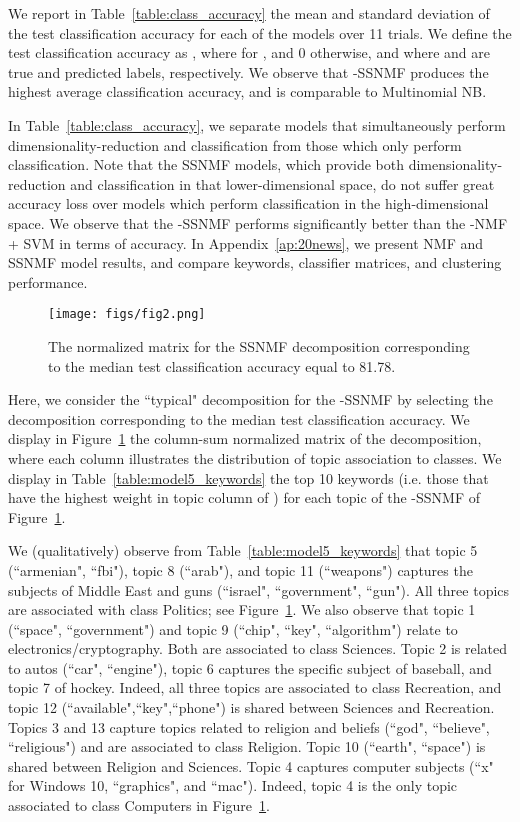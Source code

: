 \documentclass[twocolumn,10pt]{article}
\begin{document}
We report in Table~\ref{table:class_accuracy} the mean and standard deviation of the test classification accuracy for each of the models over 11 trials.
We define the test classification accuracy as , where  for , and 0 otherwise, and where  and  are true and predicted labels, respectively.
We observe that -SSNMF produces the highest average classification accuracy, and is comparable to 
Multinomial NB.

In Table~\ref{table:class_accuracy}, we separate models that simultaneously perform dimensionality-reduction and classification from those which only perform classification.  Note that the SSNMF models, which provide both dimensionality-reduction and classification in that lower-dimensional space, do not suffer great accuracy loss over models which perform classification in the high-dimensional space.
We observe that the -SSNMF performs significantly better than the -NMF + SVM in terms of accuracy.
In Appendix~\ref{ap:20news}, we present NMF and SSNMF model results, and compare keywords, classifier matrices, and clustering performance.
\begin{figure}[tb]
    \centering
    \texttt{[image: figs/fig2.png]}
    \caption{The normalized  matrix for the  SSNMF decomposition corresponding to the median test classification accuracy equal to 81.78.}
    \label{fig:SSNMF_Model5}
\end{figure}

Here, we consider the ``typical" decomposition for the -SSNMF by selecting the decomposition corresponding to the median test classification accuracy.
We display in Figure~\ref{fig:SSNMF_Model5} the column-sum normalized  matrix of the decomposition, where each column illustrates the distribution of topic association to classes.
We display in Table~\ref{table:model5_keywords} the top 10 keywords (i.e. those that have the highest weight in topic column of ) for each topic of the -SSNMF of Figure~\ref{fig:SSNMF_Model5}.



We (qualitatively) observe from Table~\ref{table:model5_keywords} that topic 5 (``armenian", ``fbi"), topic 8 (``arab"), and topic 11 (``weapons") captures the subjects of Middle East and guns (``israel", ``government", ``gun"). 
All three topics are associated with class Politics; see Figure~\ref{fig:SSNMF_Model5}.
We also observe that topic 1 (``space", ``government") and topic 9 (``chip", ``key", ``algorithm") relate to electronics/cryptography. Both are associated to class Sciences.
Topic 2 is related to autos (``car", ``engine"), topic 6 captures the specific subject of baseball, and topic 7 of hockey.
Indeed, all three topics are associated to class Recreation, and topic 12 (``available",``key",``phone") is shared between Sciences and Recreation.
Topics 3 and 13 capture topics related to religion and beliefs (``god", ``believe", ``religious") and are associated to class Religion.
Topic 10 (``earth", ``space") is shared between Religion and Sciences.
Topic 4 captures computer subjects (``x" for Windows 10, ``graphics", and ``mac"). Indeed, topic 4 is the only topic associated to class Computers in Figure~\ref{fig:SSNMF_Model5}. 
\end{document}
